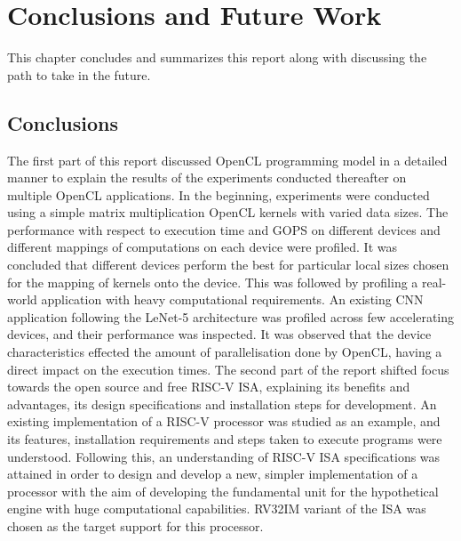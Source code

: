 \chapter{Conclusions and Future Work}
\label{ch7_conclusion}
This chapter concludes and summarizes this report along with discussing the path to take in the future.

\section{Conclusions}
\label{sect7_1}
The first part of this report discussed OpenCL programming model in a detailed manner to explain the results of the experiments conducted thereafter on multiple OpenCL applications. In the beginning, experiments were conducted using a simple matrix multiplication OpenCL kernels with varied data sizes. The performance with respect to execution time and \ac{GOPS} on different devices and different mappings of computations on each device were profiled. It was concluded that different devices perform the best for particular local sizes chosen for the mapping of kernels onto the device.\newline\newline
This was followed by profiling a real-world application with heavy computational requirements. An existing CNN application following the LeNet-5 architecture was profiled across few accelerating devices, and their performance was inspected. It was observed that the device characteristics effected the amount of parallelisation done by OpenCL, having a direct impact on the execution times.\newline\newline
The second part of the report shifted focus towards the open source and free RISC-V ISA, explaining its benefits and advantages, its design specifications and installation steps for development. An existing implementation of a RISC-V processor was studied as an example, and its features, installation requirements and steps taken to execute programs were understood.\newline\newline
Following this, an understanding of RISC-V ISA specifications was attained in order to design and develop a new, simpler implementation of a processor with the aim of developing the fundamental unit for the hypothetical engine with huge computational capabilities. RV32IM variant of the ISA was chosen as the target support for this processor.

